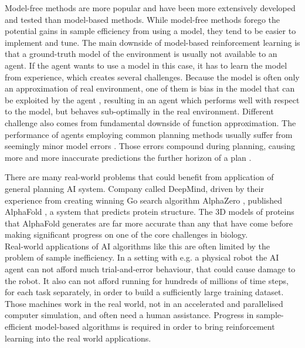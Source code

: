 Model-free methods are more popular and have been more extensively developed and tested than model-based methods. While model-free methods forego the potential gains in sample efficiency from using a model, they tend to be easier to implement and tune. The main downside of model-based reinforcement learning is that a ground-truth model of the environment is usually not available to an agent. If the agent wants to use a model in this case, it has to learn the model from experience, which creates several challenges. Because the model is often only an approximation of real environment, one of them is bias in the model that can be exploited by the agent \cite{Algo.WorldModels}, resulting in an agent which performs well with respect to the model, but behaves sub-optimally in the real environment. Different challenge also comes from fundamental downside of function approximation. The performance of agents employing common planning methods usually suffer from seemingly minor model errors  \cite{Study.PlanWithImperfectModel}. Those errors compound during planning, causing more and more inaccurate predictions the further horizon of a plan \cite{Study.CompoundingModelError}.

There are many real-world problems that could benefit from application of general planning AI system. Company called DeepMind, driven by their experience from creating winning Go search algorithm AlphaZero \cite{Algo.AlphaZero}, published AlphaFold \cite{Algo.AlphaFold}, a system that predicts protein structure. The 3D models of proteins that AlphaFold generates are far more accurate than any that have come before making significant progress on one of the core challenges in biology. \\
Real-world applications of AI algorithms like this are often limited by the problem of sample inefficiency. In a setting with e.g. a physical robot the AI agent can not afford much trial-and-error behaviour, that could cause damage to the robot. It also can not afford running for hundreds of millions of time steps, for each task separately, in order to build a sufficiently large training dataset. Those machines work in the real world, not in an accelerated and parallelised computer simulation, and often need a human assistance. Progress in sample-efficient model-based algorithms is required in order to bring reinforcement learning into the real world applications.

